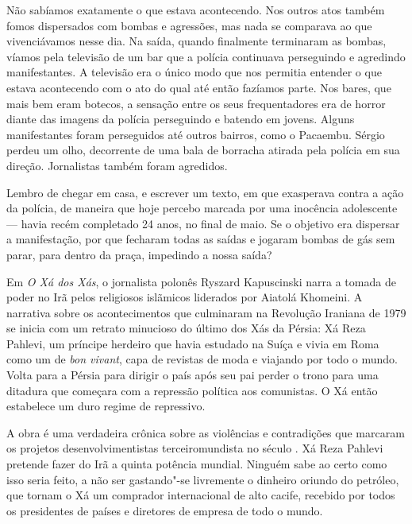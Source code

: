 Não sabíamos exatamente o que estava acontecendo. Nos outros atos também
fomos dispersados com bombas e agressões, mas nada se comparava ao que
vivenciávamos nesse dia. Na saída, quando finalmente terminaram as
bombas, víamos pela televisão de um bar que a polícia continuava
perseguindo e agredindo manifestantes. A televisão era o único modo que
nos permitia entender o que estava acontecendo com o ato do qual até
então fazíamos parte. Nos bares, que mais bem eram botecos, a sensação
entre os seus frequentadores era de horror diante das imagens da polícia
perseguindo e batendo em jovens. Alguns manifestantes foram perseguidos
até outros bairros, como o Pacaembu. Sérgio perdeu um olho, decorrente
de uma bala de borracha atirada pela polícia em sua direção. Jornalistas
também foram agredidos.

Lembro de chegar em casa, e escrever um texto, em que exasperava contra
a ação da polícia, de maneira que hoje percebo marcada por uma inocência
adolescente --- havia recém completado 24 anos, no final de maio. Se o
objetivo era dispersar a manifestação, por que fecharam todas as saídas
e jogaram bombas de gás sem parar, para dentro da praça, impedindo a
nossa saída?

\asterisc

Em \emph{O Xá dos Xás}, o jornalista polonês Ryszard Kapuscinski narra a
tomada de poder no Irã pelos religiosos islãmicos liderados por Aiatolá
Khomeini. A narrativa sobre os acontecimentos que culminaram na
Revolução Iraniana de 1979 se inicia com um retrato minucioso do último
dos Xás da Pérsia: Xá Reza Pahlevi, um príncipe herdeiro que havia
estudado na Suíça e vivia em Roma como um de \emph{bon vivant}, capa de
revistas de moda e viajando por todo o mundo. Volta para a Pérsia para
dirigir o país após seu pai perder o trono para uma ditadura que
começara com a repressão política aos comunistas. O Xá então estabelece
um duro regime de repressivo.

A obra é uma verdadeira crônica sobre as violências e contradições que
marcaram os projetos desenvolvimentistas terceiromundista no século .
Xá Reza Pahlevi pretende fazer do Irã a quinta potência mundial. Ninguém
sabe ao certo como isso seria feito, a não ser gastando"-se livremente o
dinheiro oriundo do petróleo, que tornam o Xá um comprador internacional
de alto cacife, recebido por todos os presidentes de países e diretores
de empresa de todo o mundo.

